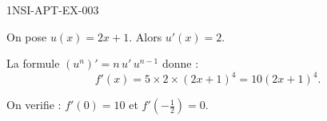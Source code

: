 \begin{corrige}{1NSI-APT-EX-003}

On pose $u(x) = 2x+1$. Alors $u'(x) = 2$.


La formule $(u^n)' = n\,u'\,u^{n-1}$ donne :
\[ f'(x) = 5 \times 2 \times (2x+1)^4 = 10(2x+1)^4. \]

On verifie : $f'(0) = 10$ et $f'\!\left(-\tfrac{1}{2}\right) = 0$.

\end{corrige}
